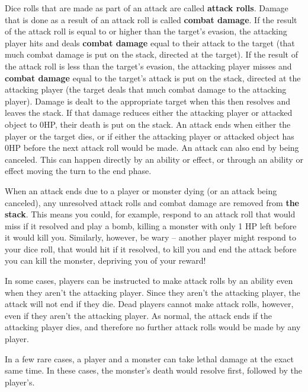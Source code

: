 \documentclass[a4paper, twoside]{report} %
\begin{document}
    Dice rolls that are made as part of an attack are called \textbf{attack rolls}. Damage that is done as a result of an attack roll is called \textbf{combat damage}. If the result of the attack roll is equal to or higher than the target’s evasion, the attacking player hits and deals \textbf{combat damage} equal to their attack to the target (that much combat damage is put on the stack, directed at the target). If the result of the attack roll is less than the target’s evasion, the attacking player misses and \textbf{combat damage} equal to the target’s attack is put on the stack, directed at the attacking player (the target deals that much combat damage to the attacking player). Damage is dealt to the appropriate target when this then resolves and leaves the stack. If that damage reduces either the attacking player or attacked object to 0HP, their death is put on the stack. An attack ends when either the player or the target dies, or if either the attacking player or attacked object has 0HP before the next attack roll would be made. An attack can also end by being canceled. This can happen directly by an ability or effect, or through an ability or effect moving the turn to the end phase.

    When an attack ends due to a player or monster dying (or an attack being canceled), any unresolved attack rolls and combat damage are removed from \textbf{the stack}. This means you could, for example, respond to an attack roll that would miss if it resolved and play a bomb, killing a monster with only 1 HP left before it would kill you. Similarly, however, be wary – another player might respond to your dice roll, that would hit if it resolved, to kill you and end the attack before you can kill the monster, depriving you of your reward!

    In some cases, players can be instructed to make attack rolls by an ability even when they aren’t the attacking player. Since they aren’t the attacking player, the attack will not end if they die. Dead players cannot make attack rolls, however, even if they aren’t the attacking player. As normal, the attack ends if the attacking player dies, and therefore no further attack rolls would be made by any player.

    In a few rare cases, a player and a monster can take lethal damage at the exact same time. In these cases, the monster’s death would resolve first, followed by the player’s.
\end{document}
